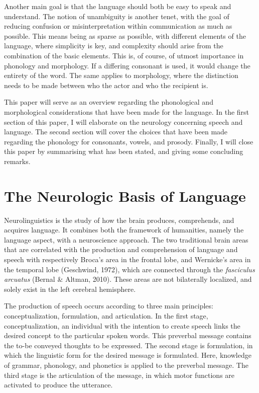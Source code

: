 Another main goal is that the language should both be easy to speak and understand. The notion of unambiguity is another tenet, with the goal of reducing confusion or misinterpretation within communication as much as possible. This means being as sparse as possible, with different elements of the language, where simplicity is key, and complexity should arise from the combination of the basic elements. This is, of course, of utmost importance in phonology and morphology. If a differing consonant is used, it would change the entirety of the word. The same applies to morphology, where the distinction needs to be made between who the actor and who the recipient is. 

This paper will serve as an overview regarding the phonological and morphological considerations that have been made for the language. In the first section of this paper, I will elaborate on the neurology concerning speech and language. The second section will cover the choices that have been made regarding the phonology for consonants, vowels, and prosody. Finally, I will close this paper by summarising what has been stated, and giving some concluding remarks.

\vfill

\section{The Neurologic Basis of Language}

Neurolinguistics is the study of how the brain produces, comprehends, and acquires language. 
It combines both the framework of humanities, namely the language aspect, with a neuroscience approach. The two traditional brain areas that are correlated with the production and comprehension of language and speech with respectively Broca’s area in the frontal lobe, and Wernicke’s area in the temporal lobe (Geschwind, 1972), which are connected through the \textit{fasciculus arcuatus} (Bernal \& Altman, 2010). These areas are not bilaterally localized, and solely exist in the left cerebral hemisphere. 

The production of speech occurs according to three main principles: conceptualization, formulation, and articulation. In the first stage, conceptualization, an individual with the intention to create speech links the desired concept to the particular spoken words. This preverbal message contains the to-be conveyed thoughts to be expressed. The second stage is formulation, in which the linguistic form for the desired message is formulated. Here, knowledge of grammar, phonology, and phonetics is applied to the preverbal message. The third stage is the articulation of the message, in which motor functions are activated to produce the utterance. 

